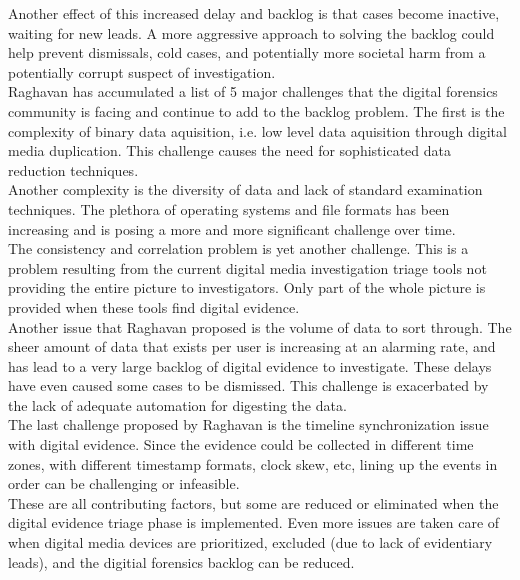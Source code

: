 \documentclass[12pt]{article}
\begin{document}
Another effect of this increased delay and backlog is that cases become inactive,
waiting for new leads.  A more aggressive approach to solving the backlog could
help prevent dismissals, cold cases, and potentially more societal harm from a
potentially corrupt suspect of investigation.\\

Raghavan\cite{raghavan2013digital} has accumulated a list of 5 major challenges
that the digital forensics community is facing and continue to add to the backlog
problem.  The first is the complexity of binary data aquisition, i.e. low level
data aquisition through digital media duplication.  This challenge causes the need
for sophisticated data reduction techniques.\\

Another complexity is the diversity of data and lack of standard examination
techniques.  The plethora of operating systems and file formats has been
increasing and is posing a more and more significant challenge over time.\\

The consistency and correlation problem is yet another challenge.  This is a
problem resulting from the current digital media investigation triage tools not
providing the entire picture to investigators.  Only part of the whole picture
is provided when these tools find digital evidence.\\

Another issue that Raghavan\cite{raghavan2013digital} proposed is the volume of
data to sort through.  The sheer amount of data that exists per user is increasing
at an alarming rate\cite{rogers2006computer}, and has lead to a very large backlog of digital
evidence to investigate.  These delays have even caused some cases to be dismissed.
This challenge is exacerbated by the lack of adequate automation for digesting the
data.\\

The last challenge proposed by Raghavan\cite{raghavan2013digital} is the timeline
synchronization issue with digital evidence.  Since the evidence could be
collected in different time zones, with different timestamp formats, clock skew,
etc, lining up the events in order can be challenging or infeasible.\\

These are all contributing factors, but some are reduced or eliminated when 
the digital evidence triage phase is implemented.  Even more issues are taken care
of when digital media devices are prioritized, excluded (due to lack of
evidentiary leads), and the digitial forensics backlog can be reduced.\\
\end{document}
